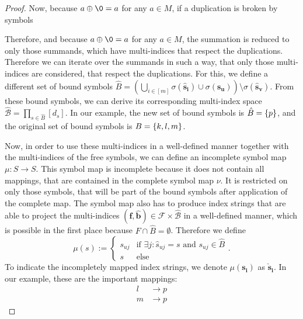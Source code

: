 \begin{proof}
    Now, because $a \oplus \0 = a$ for any $a \in M$, if a duplication is broken by symbols

    Therefore, and because $a \oplus \0 = a$ for any $a \in M$, the summation is reduced to only those summands, which have multi-indices that respect the duplications.
    Therefore we can iterate over the summands in such a way, that only those multi-indices are considered, that respect the duplications.
    For this, we define a different set of bound symbols $\hat{B} = \left(\bigcup_{i \in [m]} \sigma(\bm{\hat{s}_i}) \cup \sigma(\bm{s_u})\right) \setminus \sigma(\bm{\hat{s}_v})$.
    From these bound symbols, we can derive its corresponding multi-index space $\mathcal{\hat{B}} = \prod_{s \in \hat{B}} [d_s]$.
    In our example, the new set of bound symbols is $\hat{B} = \lbrace p \rbrace$, and the original set of bound symbols is $B = \left\lbrace k, l, m \right\rbrace$.

    Now, in order to use these multi-indices in a well-defined manner together with the multi-indices of the free symbols, we can define an incomplete symbol map $\mu: S \rightarrow S$.
    This symbol map is incomplete because it does not contain all mappings, that are contained in the complete symbol map $\nu$.
    It is restricted on only those symbols, that will be part of the bound symbols after application of the complete map.
    The symbol map also has to produce index strings that are able to project the multi-indices $(\bm{f},\bm{\hat{b}}) \in \mathcal{F} \times \mathcal{\hat{B}}$ in a well-defined manner, which is possible in the first place because $F \cap \hat{B} = \emptyset$.
    Therefore we define
    $$\mu(s) := \begin{cases}
            s_{uj} & \text{if } \exists j: \hat{s}_{uj} = s \text{ and } s_{uj} \in \hat{B} \\
            s      & \text{else}
        \end{cases}.$$
    To indicate the incompletely mapped index strings, we denote $\mu(\bm{s_i})$ as $\bm{\check{s}_i}$.
    In our example, these are the important mappings:
    \begin{align*}
        l & \rightarrow p \\
        m & \rightarrow p
    \end{align*}


\end{proof}
